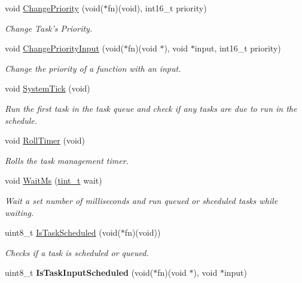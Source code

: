\begin{DoxyCompactItemize}
void \hyperlink{group__task_gaea62f111e9b59543d729ea330be9d549}{Change\+Priority} (void($\ast$fn)(void), int16\+\_\+t priority)
\begin{DoxyCompactList}\small\item\em Change Task's Priority. \end{DoxyCompactList}\item 
void \hyperlink{group__task_ga5bca6f47562aef3d28a6c598c1bb8bf9}{Change\+Priority\+Input} (void($\ast$fn)(void $\ast$), void $\ast$input, int16\+\_\+t priority)
\begin{DoxyCompactList}\small\item\em Change the priority of a function with an input. \end{DoxyCompactList}\item 
void \hyperlink{group__task_gafd2aa563748d1ede229e5867753ead5d}{System\+Tick} (void)
\begin{DoxyCompactList}\small\item\em Run the first task in the task queue and check if any tasks are due to run in the schedule. \end{DoxyCompactList}\item 
void \hyperlink{group__task_gabd957ea17a03ba5e10e18fd2821f1a7b}{Roll\+Timer} (void)
\begin{DoxyCompactList}\small\item\em Rolls the task management timer. \end{DoxyCompactList}\item 
void \hyperlink{group__task_ga51a214a49e3bca310762452c27c47c90}{Wait\+Ms} (\hyperlink{group__timing_gaef97c9386393beb1be4ed0b1513ee481}{tint\+\_\+t} wait)
\begin{DoxyCompactList}\small\item\em Wait a set number of milliseconds and run queued or shceduled tasks while waiting. \end{DoxyCompactList}\item 
uint8\+\_\+t \hyperlink{group__task_gaee42fba49f1e2560a2fb3d2debb6eab9}{Is\+Task\+Scheduled} (void($\ast$fn)(void))
\begin{DoxyCompactList}\small\item\em Checks if a task is scheduled or queued. \end{DoxyCompactList}\item 
\hypertarget{group__task_ga45595ba3616f0bd93fc5ba84a68f3623}{uint8\+\_\+t {\bfseries Is\+Task\+Input\+Scheduled} (void($\ast$fn)(void $\ast$), void $\ast$input)}\label{group__task_ga45595ba3616f0bd93fc5ba84a68f3623}

\end{DoxyCompactItemize}


